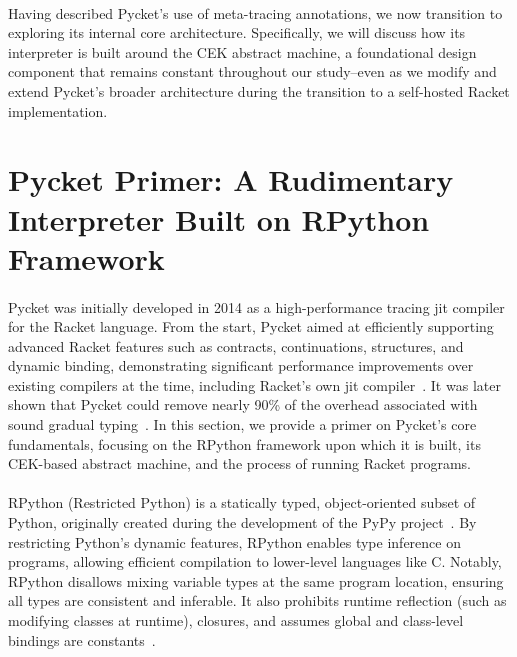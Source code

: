         \paragraph{}%
            Having described Pycket’s use of meta-tracing annotations, we now transition to exploring its internal core architecture. Specifically, we will discuss how its interpreter is built around the CEK abstract machine, a foundational design component that remains constant throughout our study--even as we modify and extend Pycket’s broader architecture during the transition to a self-hosted Racket implementation.

    \section[\texorpdfstring{Pycket Primer: A Rudimentary Interpreter Built on RPython Framework}{Pycket Primer}]{Pycket Primer: A Rudimentary Interpreter Built on RPython Framework}
        \label{section:pycket-primer}

        \paragraph{}%
            Pycket was initially developed in 2014 as a high-performance tracing \gls{jit} compiler for the Racket language. From the start, Pycket aimed at efficiently supporting advanced Racket features such as contracts, continuations, structures, and dynamic binding, demonstrating significant performance improvements over existing compilers at the time, including Racket's own \gls{jit} compiler~\cite{pycketmain}. It was later shown that Pycket could remove nearly 90\% of the overhead associated with sound gradual typing~\cite{pycketmain2}. In this section, we provide a primer on Pycket's core fundamentals, focusing on the RPython framework upon which it is built, its CEK-based abstract machine, and the process of running Racket programs.

        \paragraph{}%
            RPython (Restricted Python) is a statically typed, object-oriented subset of Python, originally created during the development of the PyPy project~\cite{pypy06}. By restricting Python’s dynamic features, RPython enables type inference on programs, allowing efficient compilation to lower-level languages like C. Notably, RPython disallows mixing variable types at the same program location, ensuring all types are consistent and inferable. It also prohibits runtime reflection (such as modifying classes at runtime), closures, and assumes global and class-level bindings are constants~\cite{rpython07,rpython09}.

